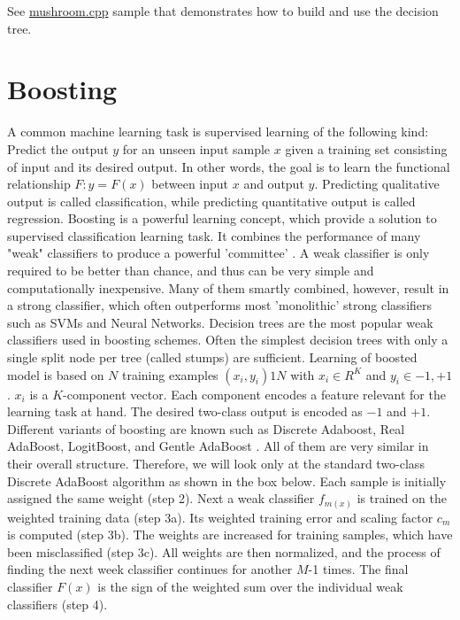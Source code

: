 
See \href{../../samples/c/mushroom.cpp}{mushroom.cpp} sample that demonstrates how to build and use the decision tree.

\section{Boosting} %

A common machine learning task is supervised learning of the following kind: Predict the output $y$ for an unseen input sample $x$ given a training set consisting of input and its desired output. In other words, the goal is to learn the functional relationship $F: y = F(x)$ between input $x$ and output $y$. Predicting qualitative output is called classification, while predicting quantitative output is called regression.
\newline
\newline
Boosting is a powerful learning concept, which provide a solution to supervised classification learning task. It combines the performance of many "weak" classifiers to produce a powerful 'committee' . A weak classifier is only required to be better than chance, and thus can be very simple and computationally inexpensive. Many of them smartly combined, however, result in a strong classifier, which often outperforms most 'monolithic' strong classifiers such as SVMs and Neural Networks.
\newline
\newline
Decision trees are the most popular weak classifiers used in boosting schemes. Often the simplest decision trees with only a single split node per tree (called stumps) are sufficient.
\newline
\newline
Learning of boosted model is based on $N$ training examples ${(x_i,y_i)}1N$ with $x_i \in{R^K}$ and $y_i \in{-1, +1}$. $x_i$ is a $K$-component vector. Each component encodes a feature relevant for the learning task at hand. The desired two-class output is encoded as −$1$ and +$1$.
\newline
\newline
Different variants of boosting are known such as Discrete Adaboost, Real AdaBoost, LogitBoost, and Gentle AdaBoost . All of them are very similar in their overall structure. Therefore, we will look only at the standard two-class Discrete AdaBoost algorithm as shown in the box below. Each sample is initially assigned the same weight (step 2). Next a weak classifier $f_{m(x)}$ is trained on the weighted training data (step 3a). Its weighted training error and scaling factor $c_m$ is computed (step 3b). The weights are increased for training samples, which have been misclassified (step 3c). All weights are then normalized, and the process of finding the next week classifier continues for another $M$-1 times. The final classifier $F(x)$ is the sign of the weighted sum over the individual weak classifiers (step 4).
